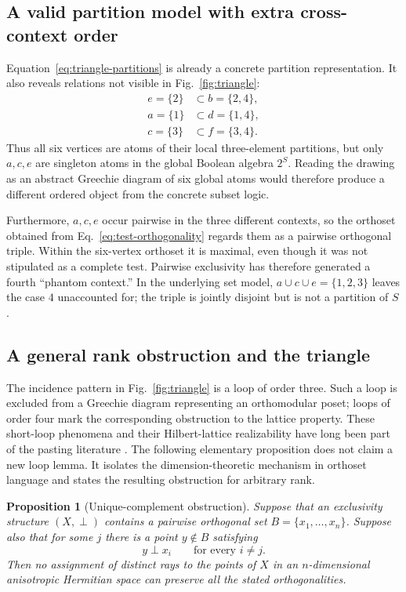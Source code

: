 \documentclass[
  aps,
  pra,
  twocolumn,
  amsmath,
  amssymb,
  longbibliography,
  nofootinbib,
  floatfix
]{revtex4-2}
\newtheorem{proposition}{Proposition}
\begin{document}
\subsection{A valid partition model with extra cross-context order}

Equation~\eqref{eq:triangle-partitions} is already a concrete partition
representation.  It also reveals relations not visible in
Fig.~\ref{fig:triangle}:
\begin{align}
  e=\{2\}&\subset b=\{2,4\},\nonumber\\
  a=\{1\}&\subset d=\{1,4\},\label{eq:triangle-inclusions}\\
  c=\{3\}&\subset f=\{3,4\}.\nonumber
\end{align}
Thus all six vertices are atoms of their local three-element partitions, but
only $a,c,e$ are singleton atoms in the global Boolean algebra $2^S$.  Reading
the drawing as an abstract Greechie diagram of six global atoms would therefore
produce a different ordered object from the concrete subset logic.

Furthermore, $a,c,e$ occur pairwise in the three different contexts, so the
orthoset obtained from Eq.~\eqref{eq:test-orthogonality} regards them as a
pairwise orthogonal triple.  Within the six-vertex orthoset it is maximal, even
though it was not stipulated as a complete test.  Pairwise exclusivity has
therefore generated a fourth ``phantom context.''  In the underlying set model,
$a\cup c\cup e=\{1,2,3\}$ leaves the case $4$ unaccounted for; the triple is
jointly disjoint but is not a partition of $S$.

\subsection{A general rank obstruction and the triangle}

The incidence pattern in Fig.~\ref{fig:triangle} is a loop of order three.
Such a loop is excluded from a Greechie diagram representing an orthomodular
poset; loops of order four mark the corresponding obstruction to the lattice
property.  These short-loop phenomena and their Hilbert-lattice realizability
have long been part of the pasting literature
\cite{greechie:71,svozil-tkadlec}.  The following elementary proposition does
not claim a new loop lemma.  It isolates the dimension-theoretic mechanism in
orthoset language and states the resulting obstruction for arbitrary rank.

\begin{proposition}[Unique-complement obstruction]
\label{prop:unique-complement}
Suppose that an exclusivity structure $(X,\perp)$ contains a pairwise
orthogonal set $B=\{x_1,\ldots,x_n\}$.  Suppose also that for
some $j$ there is a point $y\notin B$ satisfying
\begin{equation}
  y\perp x_i\qquad\text{for every }i\ne j.
  \label{eq:unique-complement-pattern}
\end{equation}
Then no assignment of distinct rays to the points of $X$ in an
$n$-dimensional anisotropic Hermitian space can preserve all the stated
orthogonalities.
\end{proposition}
\end{document}
